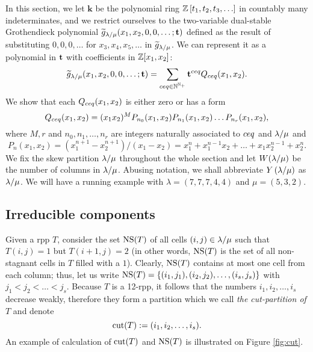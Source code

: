 \documentclass[numbers=enddot,12pt,final,onecolumn,notitlepage]{scrartcl}%
\theoremstyle{definition}
\newcommand{\kk}{\mathbf{k}}
\let\sumnonlimits\sum
\renewcommand{\sum}{\sumnonlimits\limits}
\begin{document}
In this section, we let $\kk$ be the polynomial ring
$\mathbb{Z}\left[t_1, t_2, t_3, \ldots\right]$ in countably many
indeterminates, and we restrict ourselves to the
two-variable dual-stable Grothendieck polynomial
${\widetilde{g}}_{\lambda/\mu}(x_1,x_2,0,0,\dots;{\mathbf{t}})$ defined as the result of
substituting $0, 0, 0, \ldots$ for $x_3, x_4, x_5, \ldots$
in ${\widetilde{g}}_{\lambda/\mu}$. We can represent it as a polynomial in
${\mathbf{t}}$ with coefficients in $\mathbb{Z}[x_1,x_2]$:
$$\g_\lm(x_1,x_2,0,0,\dots;\t)=\sum_{\ceqvar\in \N^{\N_+}}\t^\ceqvar Q_\ceqvar(x_1,x_2).$$
We show that each $Q_{{ceq}}(x_1,x_2)$ is either zero or has a form
$$Q_{{ceq}}(x_1,x_2)=(x_1x_2)^{M} P_{n_0}(x_1,x_2)P_{n_1}(x_1,x_2)\dots P_{n_r}(x_1,x_2) ,$$
where $M,r$ and $n_0,n_1,\dots,n_{r}$ are integers naturally associated to ${{ceq}}$ and ${\lambda/\mu}$ and 
$$P_n(x_1,x_2)=(x_1^{n+1}-x_2^{n+1})/(x_1-x_2)=x_1^{n}+x_1^{n-1}x_2+\dots+x_1x_2^{n-1}+x_2^n.$$
We fix the skew partition ${\lambda/\mu}$ throughout the whole section and let $W({\lambda/\mu})$ be the number of columns in ${\lambda/\mu}$.
Abusing notation, we shall abbreviate $Y\left({\lambda/\mu}\right)$ as ${\lambda/\mu}$.
We will have a running example with $\lambda=(7,7,7,4,4)$ and $\mu=(5,3,2)$.



\subsection{Irreducible components}
Given a rpp $T$, consider the set ${\operatorname*{NS}}(T)$ of all cells $(i,j)\in {\lambda/\mu}$ such that $T(i,j)=1$ but $T(i+1,j)=2$ (in other words, ${\operatorname*{NS}}(T)$ is the set of all non-stagnant cells in $T$ filled with a $1$). Clearly, ${\operatorname*{NS}}(T)$ contains at most one cell from each column; thus, let us write ${\operatorname*{NS}}(T)=\{(i_1,j_1),(i_2,j_2),\dots,(i_s,j_s)\}$ with $j_1<j_2<\dots<j_s$. Because $T$ is a 12-rpp, it follows that the numbers $i_1,i_2,\dots,i_s$ decrease weakly, therefore they form a partition which we call \textit{the cut-partition of} $T$ and denote 
$${\operatorname*{cut}}(T):=(i_1,i_2,\dots,i_s).$$ 
An example of calculation of ${\operatorname*{cut}}(T)$ and ${\operatorname*{NS}}(T)$ is illustrated on Figure \ref{fig:cut}.

\def\one{{\mathbf{1}}}
\def\two{{\mathbf{2}}}
\end{document}

